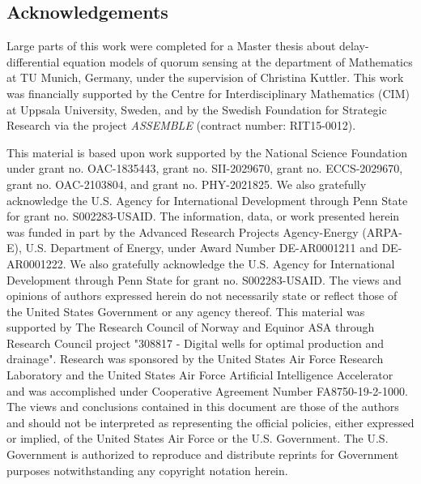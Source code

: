 \documentclass{juliacon}
\begin{document}
\subsection{Acknowledgements}

Large parts of this work were completed for a Master thesis about delay-differential equation models of quorum sensing at the department of Mathematics at TU Munich, Germany, under the supervision of Christina Kuttler.
This work was financially supported by the Centre for Interdisciplinary Mathematics (CIM) at Uppsala University, Sweden, and by the Swedish Foundation for Strategic Research via the project \emph{ASSEMBLE} (contract number: RIT15-0012).

This material is based upon work supported by the National Science Foundation under grant no. OAC-1835443, grant no. SII-2029670, grant no. ECCS-2029670, grant no. OAC-2103804, and grant no. PHY-2021825. We also gratefully acknowledge the U.S. Agency for International Development through Penn State for grant no. S002283-USAID. The information, data, or work presented herein was funded in part by the Advanced Research Projects Agency-Energy (ARPA-E), U.S. Department of Energy, under Award Number DE-AR0001211 and DE-AR0001222. We also gratefully acknowledge the U.S. Agency for International Development through Penn State for grant no. S002283-USAID. The views and opinions of authors expressed herein do not necessarily state or reflect those of the United States Government or any agency thereof. This material was supported by The Research Council of Norway and Equinor ASA through Research Council project "308817 - Digital wells for optimal production and drainage". Research was sponsored by the United States Air Force Research Laboratory and the United States Air Force Artificial Intelligence Accelerator and was accomplished under Cooperative Agreement Number FA8750-19-2-1000. The views and conclusions contained in this document are those of the authors and should not be interpreted as representing the official policies, either expressed or implied, of the United States Air Force or the U.S. Government. The U.S. Government is authorized to reproduce and distribute reprints for Government purposes notwithstanding any copyright notation herein.


\end{document}
